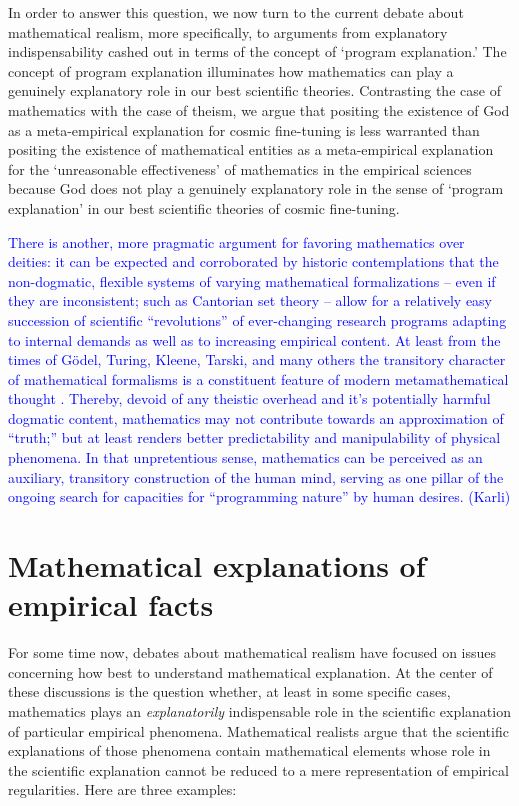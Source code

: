 \documentclass[a4paper,12pt]{article}
\newcommand{\karli}[1]{\textcolor{blue}{#1 (Karli)}}
\begin{document}
In order to answer this question, we now turn to the current debate about mathematical realism, more specifically, to arguments from explanatory indispensability cashed out in terms of the concept of `program explanation.' The concept of program explanation illuminates how mathematics can play a genuinely explanatory role in our best scientific theories. Contrasting the case of mathematics with the case of theism, we argue that positing the existence of God as a meta-empirical explanation for cosmic fine-tuning is less warranted than positing the existence of mathematical entities as a meta-empirical explanation for the `unreasonable effectiveness' of mathematics in the empirical sciences because God does not play a genuinely explanatory role in the sense of `program explanation' in our best scientific theories of cosmic fine-tuning.

\karli{
There is another, more pragmatic argument for favoring mathematics over deities:
it can be expected and corroborated by historic contemplations
that the non-dogmatic, flexible systems of varying mathematical formalizations
-- even if they are inconsistent; such as Cantorian set theory \cite{hilbert-26}
-- allow for a relatively easy succession of scientific ``revolutions''
of ever-changing research programs \cite{lakatosch}
adapting to internal demands as well as to increasing empirical content.
At least from the times of G\"odel, Turing, Kleene, Tarski, and many others
the transitory character of mathematical formalisms is a constituent feature of modern metamathematical thought
\cite{smullyan-92,Smullyan1993-SMURTF,book:486992}.
Thereby, devoid of any theistic overhead and it's potentially harmful
dogmatic content, mathematics may not contribute towards an approximation of ``truth;'' but at least
renders better predictability and manipulability of physical phenomena.
In that unpretentious sense, mathematics can be perceived as an auxiliary,
transitory construction of
the human mind, serving as one pillar
of the ongoing search for capacities for ``programming nature'' by human desires.
}

\section{Mathematical explanations of empirical facts}

For some time now, debates about mathematical realism have focused on issues concerning how best to understand mathematical explanation. At the center of these discussions is the question whether, at least in some specific cases, mathematics plays an \textit{explanatorily} indispensable role in the scientific explanation of particular empirical phenomena. Mathematical realists argue that the scientific explanations of those phenomena contain mathematical elements whose role in the scientific explanation cannot be reduced to a mere representation of empirical regularities. Here are three examples:
\end{document}
